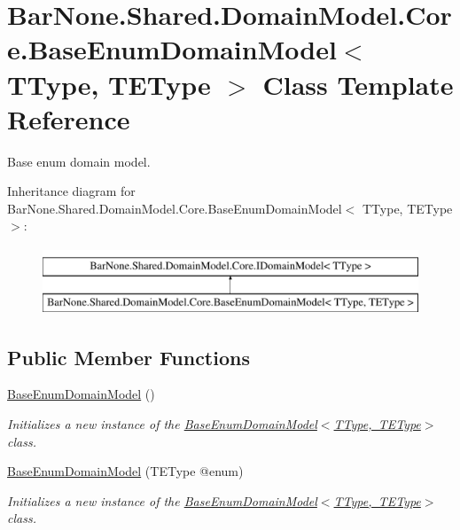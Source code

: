 \hypertarget{class_bar_none_1_1_shared_1_1_domain_model_1_1_core_1_1_base_enum_domain_model}{}\section{Bar\+None.\+Shared.\+Domain\+Model.\+Core.\+Base\+Enum\+Domain\+Model$<$ T\+Type, T\+E\+Type $>$ Class Template Reference}
\label{class_bar_none_1_1_shared_1_1_domain_model_1_1_core_1_1_base_enum_domain_model}


Base enum domain model.  


Inheritance diagram for Bar\+None.\+Shared.\+Domain\+Model.\+Core.\+Base\+Enum\+Domain\+Model$<$ T\+Type, T\+E\+Type $>$\+:\begin{figure}[H]
\begin{center}
\leavevmode
\includegraphics[height=2.000000cm]{class_bar_none_1_1_shared_1_1_domain_model_1_1_core_1_1_base_enum_domain_model}
\end{center}
\end{figure}
\subsection*{Public Member Functions}
\begin{DoxyCompactItemize}
\item 
\mbox{\hyperlink{class_bar_none_1_1_shared_1_1_domain_model_1_1_core_1_1_base_enum_domain_model_aaeae84370e53d1611ee9e48d671c6194}{Base\+Enum\+Domain\+Model}} ()
\begin{DoxyCompactList}\small\item\em Initializes a new instance of the \mbox{\hyperlink{class_bar_none_1_1_shared_1_1_domain_model_1_1_core_1_1_base_enum_domain_model_aaeae84370e53d1611ee9e48d671c6194}{Base\+Enum\+Domain\+Model$<$\+T\+Type, T\+E\+Type$>$}} class. \end{DoxyCompactList}\item 
\mbox{\hyperlink{class_bar_none_1_1_shared_1_1_domain_model_1_1_core_1_1_base_enum_domain_model_a24524d7c9a156971b443605f3cf7c28d}{Base\+Enum\+Domain\+Model}} (T\+E\+Type @enum)
\begin{DoxyCompactList}\small\item\em Initializes a new instance of the \mbox{\hyperlink{class_bar_none_1_1_shared_1_1_domain_model_1_1_core_1_1_base_enum_domain_model_aaeae84370e53d1611ee9e48d671c6194}{Base\+Enum\+Domain\+Model$<$\+T\+Type, T\+E\+Type$>$}} class. \end{DoxyCompactList}\end{DoxyCompactItemize}
